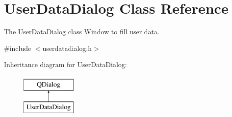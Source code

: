\hypertarget{classUserDataDialog}{\section{User\+Data\+Dialog Class Reference}
\label{classUserDataDialog}
}


The \hyperlink{classUserDataDialog}{User\+Data\+Dialog} class Window to fill user data.  




{\ttfamily \#include $<$userdatadialog.\+h$>$}

Inheritance diagram for User\+Data\+Dialog\+:\begin{figure}[H]
\begin{center}
\leavevmode
\includegraphics[height=2.000000cm]{de/d9c/classUserDataDialog}
\end{center}
\end{figure}
